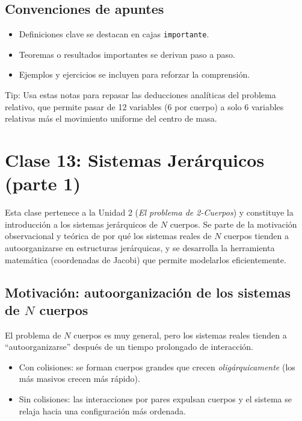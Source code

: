 \documentclass[12pt,oneside]{book}
\begin{document}
\section{Convenciones de apuntes}
\begin{itemize}[leftmargin=2em]
    \item Definiciones clave se destacan en cajas \texttt{importante}.
    \item Teoremas o resultados importantes se derivan paso a paso.
    \item Ejemplos y ejercicios se incluyen para reforzar la comprensión.
\end{itemize}

\begin{importante}
Tip: Usa estas notas para repasar las deducciones analíticas del problema relativo, que permite pasar de 12 variables (6 por cuerpo) a solo 6 variables relativas más el movimiento uniforme del centro de masa.
\end{importante}


\chapter{Clase 13: Sistemas Jerárquicos (parte 1)}

Esta clase pertenece a la Unidad 2 (\emph{El problema de 2-Cuerpos}) y constituye la introducción a los sistemas jerárquicos de \(N\) cuerpos. Se parte de la motivación observacional y teórica de por qué los sistemas reales de \(N\) cuerpos tienden a autoorganizarse en estructuras jerárquicas, y se desarrolla la herramienta matemática (coordenadas de Jacobi) que permite modelarlos eficientemente.

\section{Motivación: autoorganización de los sistemas de \(N\) cuerpos}
El problema de \(N\) cuerpos es muy general, pero los sistemas reales tienden a ``autoorganizarse'' después de un tiempo prolongado de interacción.

\begin{itemize}
    \item Con colisiones: se forman cuerpos grandes que crecen \emph{oligárquicamente} (los más masivos crecen más rápido).
    \item Sin colisiones: las interacciones por pares expulsan cuerpos y el sistema se relaja hacia una configuración más ordenada.
\end{itemize}
\end{document}
